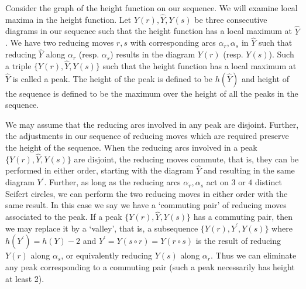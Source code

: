 Consider the graph of the height function on our sequence. We will examine local maxima in the height function. Let $Y(r), \hat{Y}, Y(s)$ be three consecutive diagrams in our sequence such that the height function has a local maximum at $\hat{Y}$. We have two reducing moves $r,s $ with corresponding arcs $\alpha_r, \alpha_s$ in $\hat{Y}$ such that reducing $\hat{Y}$ along $\alpha_r$ (resp. $\alpha_s$) results in the diagram $Y(r)$ (resp. $Y(s)$). Such a triple  $\{Y(r), \hat{Y}, Y(s)\}$ such that the height function has a local maximum at $\hat{Y}$ is called a peak. The height of the peak is defined to be $h(\hat{Y})$ and height of the sequence is defined to be the maximum over the height of all the peaks in the sequence. 

We may assume that the reducing arcs involved in any peak are disjoint. Further, the adjustments in our sequence of reducing moves which are required preserve the height of the sequence. When the reducing arcs involved in a peak $\{Y(r), \hat{Y}, Y(s) \}$ are disjoint, the reducing moves commute, that is, they can be performed in either order, starting with the diagram $\hat{Y}$ and resulting in the same diagram $Y^{\prime}$. Further, as long as the
reducing arcs $\alpha_r, \alpha_s$ act on $3$ or $4$ distinct Seifert circles, we can perform the two reducing moves in either order with the same result. In
this case we say we have a ‘commuting pair’ of reducing moves associated to the peak. If a peak $\{Y(r), \hat{Y}, Y(s) \}$ has a commuting pair, then we may replace it by a ‘valley’, that is, a subsequence $\{Y(r), Y^{\prime}, Y(s) \}$ where $h(Y^{\prime}) = h(Y) - 2$ and $Y^{\prime} = Y(s \circ r) = Y(r \circ s)$ is the result of reducing $Y(r)$ along $\alpha_s$, or equivalently reducing $Y(s)$ along $\alpha_r$. Thus we can eliminate any peak corresponding to a commuting pair (such a peak necessarily has height at least 2).

